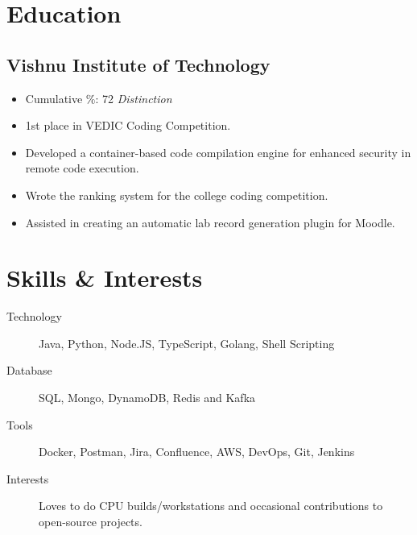 \documentclass[11pt]{article}
\begin{document}
\section{Education}
\subsection{Vishnu Institute of Technology  }
\begin{itemize}
    \item Cumulative \(\%\): 72 \textit{Distinction}
    \item 1st place in VEDIC Coding Competition.
    \item Developed a container-based code compilation engine for enhanced security in remote code execution.
    \item Wrote the ranking system for the college coding competition.
    \item Assisted in creating an automatic lab record generation plugin for Moodle.
\end{itemize}



\section{Skills \& Interests}
\begin{description}
	\item[Technology] Java, Python, Node.JS, TypeScript, Golang, Shell Scripting
    \item[Database] SQL, Mongo, DynamoDB, Redis and Kafka
    \item[Tools] Docker, Postman, Jira, Confluence, AWS, DevOps, Git, Jenkins
	\item[Interests] Loves to do CPU builds/workstations and occasional contributions to open-source projects.
\end{description}
\end{document}
